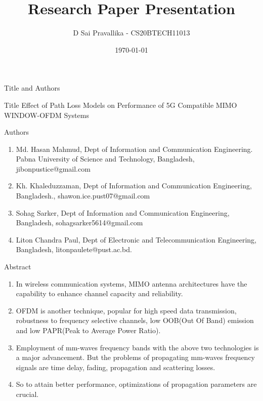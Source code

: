 \documentclass{beamer}
\title{Research Paper Presentation}
\author{D Sai Pravallika - CS20BTECH11013}
\date{\today}
\begin{document}
\begin{frame}
\titlepage
\end{frame}

\begin{frame}{Title and Authors}
   \begin{block}{Title}
    Effect of Path Loss Models on Performance of 5G Compatible MIMO WINDOW-OFDM Systems  
   \end{block}
   \begin{block}{Authors}
    \begin{enumerate}
        \item Md. Hasan Mahmud, Dept of Information and Communication Engineering. Pabna University of Science and Technology, Bangladesh, jibonpustice@gmail.com
        \item Kh. Khaleduzzaman, Dept of Information and Communication Engineering, Bangladesh., shawon.ice.pust07@gmail.com
        \item Sohag Sarker, Dept of Information and Communication Engineering, Bangladesh, sohagsarker5614@gmail.com
        \item Liton Chandra Paul, Dept of Electronic and Telecommunication Engineering, Bangladesh, litonpaulete@pust.ac.bd.

    \end{enumerate}  
   \end{block}
\end{frame}

\begin{frame}{Abstract}
    \begin{block}{}
    \begin{enumerate}
        \item In wireless communication systems, MIMO antenna architectures have the capability to enhance channel capacity and reliability.
        \item OFDM is another technique, popular for high speed data transmission, robustness to frequency selective channels, low OOB(Out Of Band) emission and low PAPR(Peak to Average Power Ratio).
        \item Employment of mm-waves frequency bands with the above two technologies is a major advancement. But the problems of propagating mm-waves frequency signals are time delay, fading, propagation and scattering losses.
        \item So to attain better performance, optimizations of propagation parameters are crucial. 
    \end{enumerate}   
    \end{block}
\end{frame}
\end{document}
